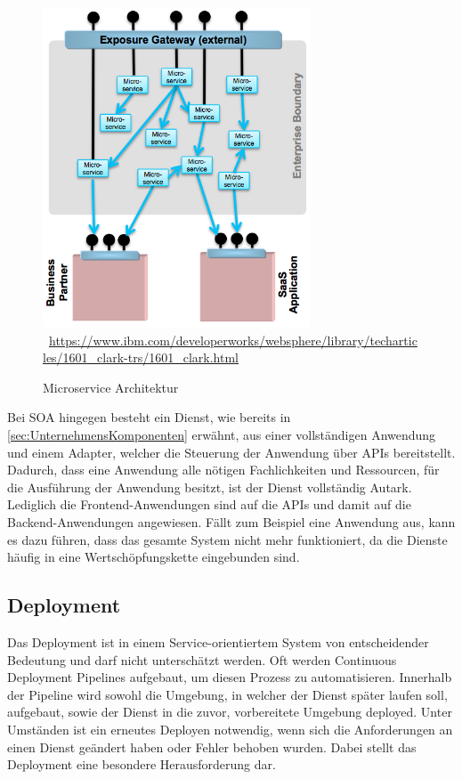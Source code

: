 \begin{figure}[htb]
    \centering 
    \includegraphics[width=300px]{content/images/figure6}\
    \quelle\url{https://www.ibm.com/developerworks/websphere/library/techarticles/1601_clark-trs/1601_clark.html}
    \caption{Microservice Architektur}
    \label{fig:MicroserviceArchitekturInGreenField} 
\end{figure}
\newpage
Bei SOA hingegen besteht ein Dienst, wie bereits in \ref{sec:UnternehmensKomponenten}  erwähnt, aus einer vollständigen Anwendung und einem Adapter, welcher die Steuerung der Anwendung über APIs bereitstellt. Dadurch, dass eine Anwendung alle nötigen Fachlichkeiten und Ressourcen, für die Ausführung der Anwendung besitzt, ist der Dienst vollständig Autark. Lediglich die Frontend-Anwendungen sind auf die APIs und damit auf die Backend-Anwendungen angewiesen. Fällt zum Beispiel eine Anwendung aus, kann es dazu führen, dass das gesamte System nicht mehr funktioniert, da die Dienste häufig in eine Wertschöpfungskette eingebunden sind.

\subsection{Deployment}
\label{subsec:Deployment}
Das Deployment ist in einem Service-orientiertem System von entscheidender Bedeutung und darf nicht unterschätzt werden. Oft werden Continuous Deployment Pipelines aufgebaut, um diesen Prozess zu automatisieren. Innerhalb der Pipeline wird sowohl die Umgebung, in welcher der Dienst später laufen soll, aufgebaut, sowie der Dienst in die zuvor, vorbereitete Umgebung deployed. Unter Umständen ist ein erneutes Deployen notwendig, wenn sich die Anforderungen an einen Dienst geändert haben oder Fehler behoben wurden. Dabei stellt das Deployment eine besondere Herausforderung dar. 

